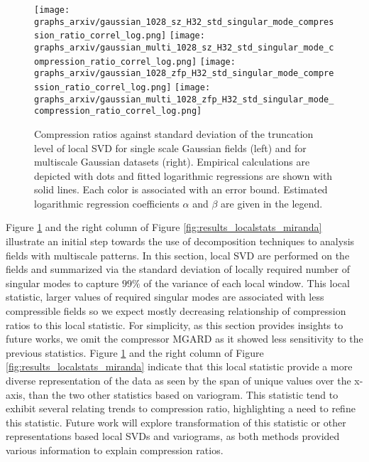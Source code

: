 \documentclass[conference]{IEEEtran}
\begin{document}
%
\begin{figure}
\centering
 \texttt{[image: graphs\_arxiv/gaussian\_1028\_sz\_H32\_std\_singular\_mode\_compression\_ratio\_correl\_log.png]} \hspace{-8pt} 
 \texttt{[image: graphs\_arxiv/gaussian\_multi\_1028\_sz\_H32\_std\_singular\_mode\_compression\_ratio\_correl\_log.png]} 
 \texttt{[image: graphs\_arxiv/gaussian\_1028\_zfp\_H32\_std\_singular\_mode\_compression\_ratio\_correl\_log.png]} \hspace{-8pt} 
 \texttt{[image: graphs\_arxiv/gaussian\_multi\_1028\_zfp\_H32\_std\_singular\_mode\_compression\_ratio\_correl\_log.png]} 
 \vspace{-10pt}
\caption{Compression ratios against standard deviation of the truncation level of local SVD for  single  scale  Gaussian fields (left) and for multiscale Gaussian datasets (right). 
Empirical calculations are depicted with dots and fitted logarithmic regressions are shown with solid lines. 
Each color is associated with an error bound.
Estimated logarithmic regression coefficients $\alpha$ and $\beta$ are given in the legend. 
}
\label{fig:results_localsvd_gaussian}
\vspace{-15pt}
\end{figure}
%


Figure \ref{fig:results_localsvd_gaussian} and the right column of Figure \ref{fig:results_localstats_miranda} illustrate an initial step towards the use of decomposition techniques to analysis fields with multiscale patterns. In this  section, local SVD  are performed on the fields and summarized  via the standard deviation of locally required number of singular modes to capture $99\%$ of  the variance  of each  local window. 
This  local statistic, larger values of required singular modes are associated with less compressible fields  so we expect mostly decreasing relationship of compression  ratios to this local statistic. 
For simplicity, as this  section provides insights to future  works, we omit  the  compressor MGARD  as  it showed less sensitivity to the previous statistics. 
Figure \ref{fig:results_localsvd_gaussian} and the right column of Figure \ref{fig:results_localstats_miranda} indicate that this  local statistic provide  a  more diverse representation of the data as seen by the  span of unique values  over  the x-axis, than  the two other statistics based on variogram.  
This statistic tend to exhibit several  relating trends to compression ratio, highlighting a need  to refine this statistic.   
Future work will explore transformation of  this  statistic or other representations based local SVDs and variograms, as both methods provided various information to explain compression ratios. 
\end{document}
